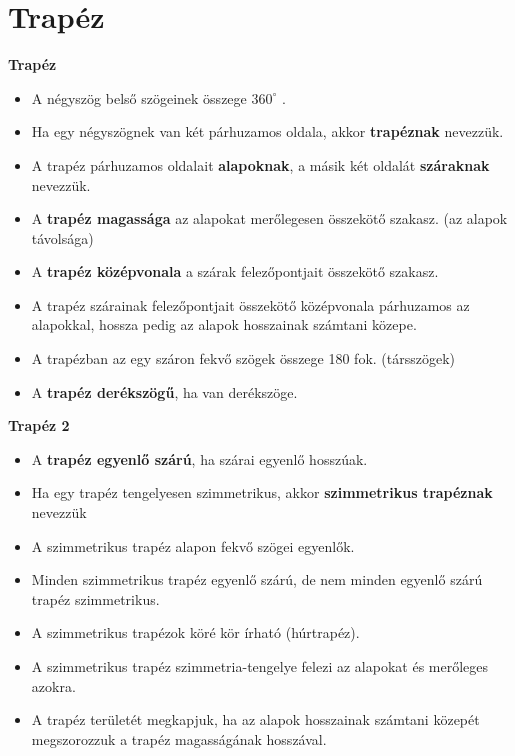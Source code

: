 \documentclass[11pt]{beamer}
\begin{document}
\section{\textbf{Trapéz}}
\begin{frame}[<+->]
\begin{block}{\textbf{Trapéz}}

\begin{itemize}[label=$\circ$]
\item A négyszög belső szögeinek összege $360^\circ$ .
\end{itemize}
\begin{itemize}[label=$\circ$]
\item Ha egy négyszögnek van két párhuzamos oldala, akkor \textbf{trapéznak} nevezzük.
\item A trapéz párhuzamos oldalait \textbf{alapoknak}, a másik két oldalát \textbf{száraknak} nevezzük.
\item A \textbf{trapéz magassága} az alapokat merőlegesen összekötő szakasz. (az alapok távolsága)
\item A \textbf{trapéz középvonala} a szárak felezőpontjait összekötő szakasz.
\item A trapéz szárainak felezőpontjait összekötő középvonala párhuzamos az alapokkal, hossza pedig az alapok hosszainak számtani közepe.
\item A trapézban az egy száron fekvő szögek összege 180 fok. (társszögek)
\item A \textbf{trapéz derékszögű}, ha van derékszöge.
\end{itemize}
\end{block}
\end{frame}

\begin{frame}[<+->]
\begin{block}{\textbf{Trapéz 2}}
\begin{itemize}[label=$\circ$]
\item A \textbf{trapéz egyenlő szárú}, ha szárai egyenlő hosszúak.
\item Ha egy trapéz tengelyesen szimmetrikus, akkor \textbf{szimmetrikus trapéznak} nevezzük
\item A szimmetrikus trapéz alapon fekvő szögei egyenlők.
\item Minden szimmetrikus trapéz egyenlő szárú, de nem minden egyenlő szárú trapéz szimmetrikus.
\item A szimmetrikus trapézok köré kör írható (húrtrapéz).
\item A szimmetrikus trapéz szimmetria-tengelye felezi az alapokat és merőleges azokra.
\item A trapéz területét megkapjuk, ha az alapok hosszainak számtani közepét megszorozzuk a trapéz magasságának hosszával.
\end{itemize}
\end{block}
\end{frame}
\end{document}
